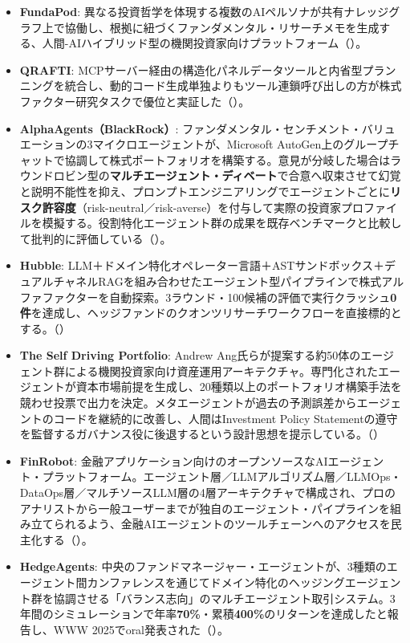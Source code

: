 \begin{itemize}
  \item \textbf{FundaPod}: 異なる投資哲学を体現する複数のAIペルソナが共有ナレッジグラフ上で協働し、根拠に紐づくファンダメンタル・リサーチメモを生成する、人間-AIハイブリッド型の機関投資家向けプラットフォーム（\cite{fundapod2026}）。
  \item \textbf{QRAFTI}: MCPサーバー経由の構造化パネルデータツールと内省型プランニングを統合し、動的コード生成単独よりもツール連鎖呼び出しの方が株式ファクター研究タスクで優位と実証した（\cite{qrafti2026}）。
  \item \textbf{AlphaAgents（BlackRock）}: ファンダメンタル・センチメント・バリュエーションの3マイクロエージェントが、Microsoft AutoGen上のグループチャットで協調して株式ポートフォリオを構築する。意見が分岐した場合はラウンドロビン型の\textbf{マルチエージェント・ディベート}で合意へ収束させて幻覚と説明不能性を抑え、プロンプトエンジニアリングでエージェントごとに\textbf{リスク許容度}（risk-neutral／risk-averse）を付与して実際の投資家プロファイルを模擬する。役割特化エージェント群の成果を既存ベンチマークと比較して批判的に評価している（\cite{alphaagents2025}）。
  \item \textbf{Hubble}: LLM＋ドメイン特化オペレーター言語＋ASTサンドボックス＋デュアルチャネルRAGを組み合わせたエージェント型パイプラインで株式アルファファクターを自動探索。3ラウンド・100候補の評価で実行クラッシュ\textbf{0件}を達成し、ヘッジファンドのクオンツリサーチワークフローを直接標的とする。（\cite{hubblealpha2026}）
  \item \textbf{The Self Driving Portfolio}: Andrew Ang氏らが提案する約50体のエージェント群による機関投資家向け資産運用アーキテクチャ。専門化されたエージェントが資本市場前提を生成し、20種類以上のポートフォリオ構築手法を競わせ投票で出力を決定。メタエージェントが過去の予測誤差からエージェントのコードを継続的に改善し、人間はInvestment Policy Statementの遵守を監督するガバナンス役に後退するという設計思想を提示している。（\cite{selfdrivingportfolio2026}）
  \item \textbf{FinRobot}: 金融アプリケーション向けのオープンソースなAIエージェント・プラットフォーム。エージェント層／LLMアルゴリズム層／LLMOps・DataOps層／マルチソースLLM層の4層アーキテクチャで構成され、プロのアナリストから一般ユーザーまでが独自のエージェント・パイプラインを組み立てられるよう、金融AIエージェントのツールチェーンへのアクセスを民主化する（\cite{finrobot2024}）。
  \item \textbf{HedgeAgents}: 中央のファンドマネージャー・エージェントが、3種類のエージェント間カンファレンスを通じてドメイン特化のヘッジングエージェント群を協調させる「バランス志向」のマルチエージェント取引システム。3年間のシミュレーションで年率\textbf{70\%}・累積\textbf{400\%}のリターンを達成したと報告し、WWW 2025でoral発表された（\cite{hedgeagents2025}）。

\end{itemize}
